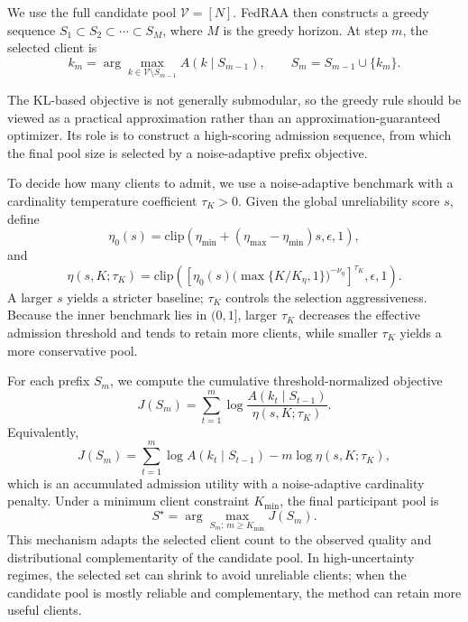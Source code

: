 \documentclass[conference]{IEEEtran}
\theoremstyle{definition}
\theoremstyle{remark}
\begin{document}
We use the full candidate pool $\mathcal V=[N]$.
FedRAA then constructs a greedy sequence $S_1\subset S_2\subset\cdots\subset S_M$, where $M$ is the greedy horizon.
At step $m$, the selected client is
\begin{equation}
\label{eq:greedy_step}
k_m
=
\arg\max_{k\in\mathcal V\setminus S_{m-1}}
A(k\mid S_{m-1}),
\qquad
S_m=S_{m-1}\cup\{k_m\}.
\end{equation}

The KL-based objective is not generally submodular, so the greedy rule should be viewed as a practical approximation rather than an approximation-guaranteed optimizer.
Its role is to construct a high-scoring admission sequence, from which the final pool size is selected by a noise-adaptive prefix objective.

To decide how many clients to admit, we use a noise-adaptive benchmark with a cardinality temperature coefficient $\tau_K>0$.
Given the global unreliability score $s$, define
\[
\eta_0(s)=\mathrm{clip}(\eta_{\min}+(\eta_{\max}-\eta_{\min})s,\epsilon,1),
\]
and
\begin{equation}
\label{eq:eta_temp}
\eta(s,K;\tau_K)
=
\mathrm{clip}\!\left(
\left[
\eta_0(s)\bigl(\max\{K/K_\eta,1\}\bigr)^{-\nu_\eta}
\right]^{\tau_K},
\epsilon,1
\right).
\end{equation}
A larger $s$ yields a stricter baseline; $\tau_K$ controls the selection aggressiveness.
Because the inner benchmark lies in $(0,1]$, larger $\tau_K$ decreases the effective admission threshold and tends to retain more clients, while smaller $\tau_K$ yields a more conservative pool.

For each prefix $S_m$, we compute the cumulative threshold-normalized objective
\begin{equation}
\label{eq:prefix_objective}
J(S_m)
=
\sum_{t=1}^{m}
\log
\frac{
A(k_t\mid S_{t-1})
}{
\eta(s,K;\tau_K)
}.
\end{equation}
Equivalently,
\[
J(S_m)=\sum_{t=1}^{m}\log A(k_t\mid S_{t-1})-m\log\eta(s,K;\tau_K),
\]
which is an accumulated admission utility with a noise-adaptive cardinality penalty.
Under a minimum client constraint $K_{\min}$, the final participant pool is
\begin{equation}
\label{eq:variable_size_selection}
S^\star
=
\arg\max_{S_m:\,m\ge K_{\min}}
J(S_m).
\end{equation}
This mechanism adapts the selected client count to the observed quality and distributional complementarity of the candidate pool.
In high-uncertainty regimes, the selected set can shrink to avoid unreliable clients; when the candidate pool is mostly reliable and complementary, the method can retain more useful clients.
\end{document}
